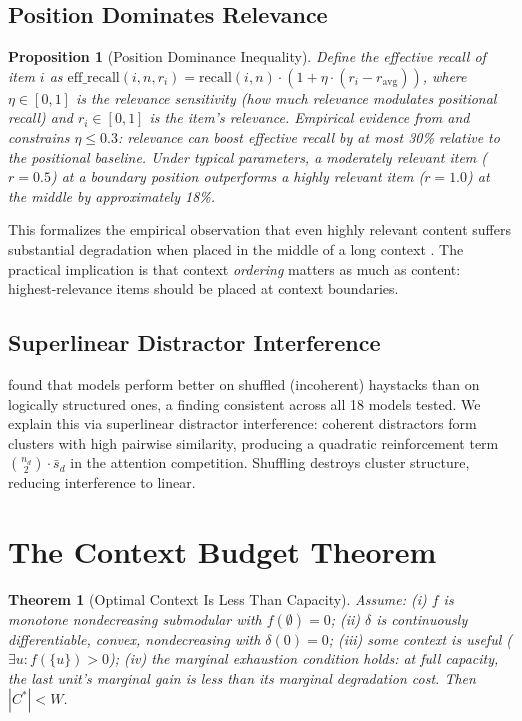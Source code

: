 \documentclass[11pt, a4paper, logo, copyright]{googledeepmind}
\newtheorem{theorem}{Theorem}[section]
\newtheorem{proposition}{Proposition}[section]
\begin{document}
\subsection{Position Dominates Relevance}

\begin{proposition}[Position Dominance Inequality]
\label{prop:position}
Define the effective recall of item $i$ as $\text{eff\_recall}(i, n, r_i) = \text{recall}(i,n) \cdot (1 + \eta \cdot (r_i - r_{\text{avg}}))$, where $\eta \in [0,1]$ is the \emph{relevance sensitivity} (how much relevance modulates positional recall) and $r_i \in [0,1]$ is the item's relevance. Empirical evidence from \citet{du2025context} and \citet{chroma2025contextrot} constrains $\eta \leq 0.3$: relevance can boost effective recall by at most 30\% relative to the positional baseline. Under typical parameters, a moderately relevant item ($r = 0.5$) at a boundary position outperforms a highly relevant item ($r = 1.0$) at the middle by approximately 18\%.
\end{proposition}

This formalizes the empirical observation that even highly relevant content suffers substantial degradation when placed in the middle of a long context \citep{liu2024lost, du2025context}. The practical implication is that context \emph{ordering} matters as much as content: highest-relevance items should be placed at context boundaries.

\subsection{Superlinear Distractor Interference}

\citet{chroma2025contextrot} found that models perform better on shuffled (incoherent) haystacks than on logically structured ones, a finding consistent across all 18 models tested. We explain this via superlinear distractor interference: coherent distractors form clusters with high pairwise similarity, producing a quadratic reinforcement term $\binom{n_d}{2} \cdot \bar{s}_d$ in the attention competition. Shuffling destroys cluster structure, reducing interference to linear.


\section{The Context Budget Theorem}
\label{sec:budget}

\begin{theorem}[Optimal Context Is Less Than Capacity]
\label{thm:budget}
Assume: (i) $f$ is monotone nondecreasing submodular with $f(\emptyset) = 0$; (ii) $\delta$ is continuously differentiable, convex, nondecreasing with $\delta(0) = 0$; (iii) some context is useful ($\exists u: f(\{u\}) > 0$); (iv) the marginal exhaustion condition holds: at full capacity, the last unit's marginal gain is less than its marginal degradation cost. Then $|C^*| < W$.
\end{theorem}
\end{document}
